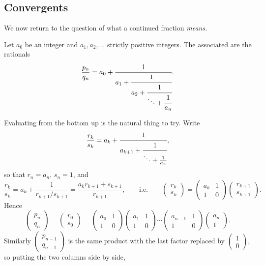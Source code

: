 \subsection{Convergents}

We now return to the question of what a continued fraction \emph{means}.

\begin{definition}
	Let $a_0$ be an integer and $a_1,a_2,\ldots$ strictly positive integers. The associated  are the rationals
	$$\frac{p_n}{q_n} = a_0+\cfrac1{a_1+\cfrac1{a_2+\cfrac1{\ddots+\cfrac1{a_n}}}}.$$
\end{definition}

Evaluating from the bottom up is the natural thing to try. Write
$$\frac{r_k}{s_k} = a_k+\cfrac1{a_{k+1}+\cfrac1{\ddots+\frac1{a_n}}},$$
so that $r_n = a_n$, $s_n=1$, and
$$\frac{r_k}{s_k} = a_k + \frac{1}{r_{k+1}/s_{k+1}} = \frac{a_kr_{k+1}+s_{k+1}}{r_{k+1}}, \qquad\text{i.e.}\qquad \begin{pmatrix}r_k\\s_k\end{pmatrix} = \begin{pmatrix}a_k&1\\1&0\end{pmatrix}\begin{pmatrix}r_{k+1}\\s_{k+1}\end{pmatrix}.$$
Hence
$$\begin{pmatrix}p_n\\q_n\end{pmatrix} = \begin{pmatrix}r_0\\s_0\end{pmatrix} = \begin{pmatrix}a_0&1\\1&0\end{pmatrix}\begin{pmatrix}a_1&1\\1&0\end{pmatrix}\cdots\begin{pmatrix}a_{n-1}&1\\1&0\end{pmatrix}\begin{pmatrix}a_n\\1\end{pmatrix}.$$
Similarly $\begin{pmatrix}p_{n-1}\\q_{n-1}\end{pmatrix}$ is the same product with the last factor replaced by $\begin{pmatrix}1\\0\end{pmatrix}$, so putting the two columns side by side,
